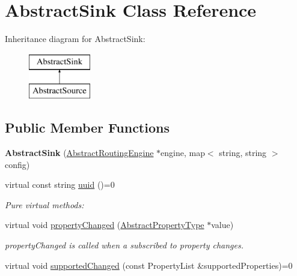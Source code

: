 \hypertarget{classAbstractSink}{\section{Abstract\-Sink Class Reference}
\label{classAbstractSink}
}
Inheritance diagram for Abstract\-Sink\-:\begin{figure}[H]
\begin{center}
\leavevmode
\includegraphics[height=2.000000cm]{classAbstractSink}
\end{center}
\end{figure}
\subsection*{Public Member Functions}
\begin{DoxyCompactItemize}
\item 
\hypertarget{classAbstractSink_a63f03d63fd091cd6f39a9888dd08ea6a}{{\bfseries Abstract\-Sink} (\hyperlink{classAbstractRoutingEngine}{Abstract\-Routing\-Engine} $\ast$engine, map$<$ string, string $>$ config)}\label{classAbstractSink_a63f03d63fd091cd6f39a9888dd08ea6a}

\item 
virtual const string \hyperlink{classAbstractSink_a965ae1d5218713c7823fbd95fa51b053}{uuid} ()=0
\begin{DoxyCompactList}\small\item\em Pure virtual methods\-: \end{DoxyCompactList}\item 
virtual void \hyperlink{classAbstractSink_afeb683c566a5a71303d05d2e12da2b28}{property\-Changed} (\hyperlink{classAbstractPropertyType}{Abstract\-Property\-Type} $\ast$value)
\begin{DoxyCompactList}\small\item\em property\-Changed is called when a subscribed to property changes. \end{DoxyCompactList}\item 
virtual void \hyperlink{classAbstractSink_aa9538a89536e8b6495551283116a588b}{supported\-Changed} (const Property\-List \&supported\-Properties)=0
\end{DoxyCompactItemize}
